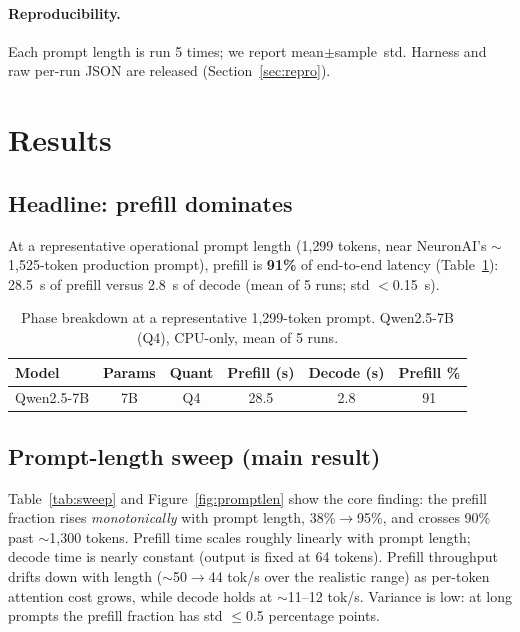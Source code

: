 \documentclass[10pt,twocolumn]{article}
\begin{document}
\paragraph{Reproducibility.}
Each prompt length is run 5 times; we report mean$\pm$sample~std. Harness
and raw per-run JSON are released (Section~\ref{sec:repro}).

\section{Results}
\label{sec:results}

\subsection{Headline: prefill dominates}
\label{sec:results-headline}
At a representative operational prompt length (1{,}299 tokens, near
NeuronAI's $\sim$1{,}525-token production prompt), prefill is
\textbf{91\%} of end-to-end latency (Table~\ref{tab:money}): 28.5~s of
prefill versus 2.8~s of decode (mean of 5 runs; std $<$0.15~s).

\begin{table}[t]
  \centering
  \caption{Phase breakdown at a representative 1{,}299-token prompt.
  Qwen2.5-7B (Q4), CPU-only, mean of 5 runs.}
  \label{tab:money}
  \begin{tabular}{lccccc}
    \toprule
    Model & Params & Quant & Prefill (s) & Decode (s) & Prefill \% \\
    \midrule
    Qwen2.5-7B & 7B & Q4 & 28.5 & 2.8 & 91 \\
    \bottomrule
  \end{tabular}
\end{table}

\subsection{Prompt-length sweep (main result)}
\label{sec:results-promptlen}
Table~\ref{tab:sweep} and Figure~\ref{fig:promptlen} show the core finding:
the prefill fraction rises \emph{monotonically} with prompt length,
38\%$\rightarrow$95\%, and crosses 90\% past $\sim$1{,}300 tokens. Prefill
time scales roughly linearly with prompt length; decode time is nearly
constant (output is fixed at 64 tokens). Prefill throughput drifts down
with length ($\sim$50$\rightarrow$44 tok/s over the realistic range) as
per-token attention cost grows, while decode holds at $\sim$11--12 tok/s.
Variance is low: at long prompts the prefill fraction has std $\leq$0.5
percentage points.
\end{document}
